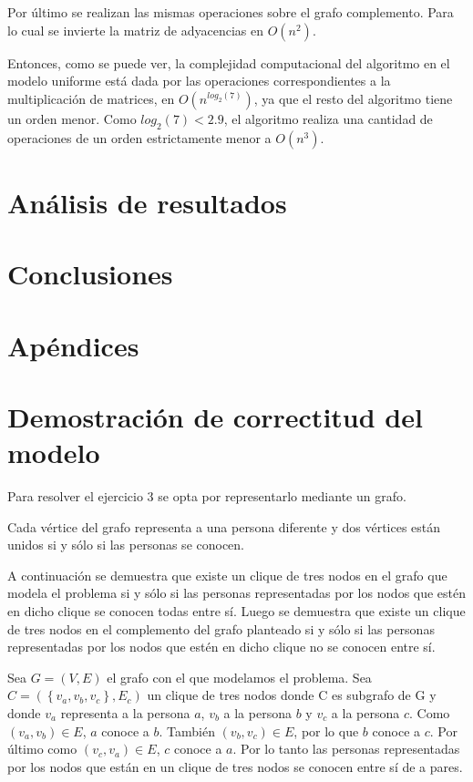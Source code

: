\documentclass[a4paper, 12pt]{article}
\begin{document}
Por \'ultimo se realizan las mismas operaciones sobre el grafo complemento. Para lo cual se invierte la matriz de adyacencias en $O \left( n^2 \right)$.


Entonces, como se puede ver, la complejidad computacional del algoritmo en el modelo uniforme est\'a dada por las operaciones correspondientes a la multiplicaci\'on de matrices, en $O \left( n^{log_2\left(7\right)} \right) $, ya que el resto del algoritmo tiene un orden menor. Como $log_2\left(7\right) < 2.9 $, el algoritmo realiza una cantidad de operaciones de un orden estrictamente menor a $O\left( n^3\right) $.




\section*{An\'alisis de resultados}
\section*{Conclusiones}

\section*{Ap\'endices}
\section{Demostraci\'on de correctitud del modelo}\label{dem_clique}

Para resolver el ejercicio 3 se opta por representarlo mediante un grafo.

Cada v\'ertice del grafo representa a una persona diferente y dos v\'ertices est\'an unidos si y s\'olo si las personas se conocen.


A continuaci\'on se demuestra que existe un clique de tres nodos en el grafo que modela el problema si y s\'olo si las personas representadas por los nodos que est\'en en dicho clique se conocen todas entre s\'i. Luego se demuestra que existe un clique de tres nodos en el complemento del grafo planteado si y s\'olo si las personas representadas por los nodos que est\'en en dicho clique no se conocen entre s\'i.

Sea $G = \left( V, E \right)$ el grafo con el que modelamos el problema. Sea $ C = \left( \left\lbrace v_a, v_b,v_c \right\rbrace, E_c \right) $ un clique de tres nodos donde C es subgrafo de G y donde $v_a$ representa a la persona $a$, $v_b$ a la persona $b$ y $v_c$ a la persona $c$. Como $\left( v_a, v_b \right) \in E $, $a$ conoce a $b$. Tambi\'en $\left(v_b,v_c\right) \in E$, por lo que $b$ conoce a $c$. Por \'ultimo como $\left(v_c,v_a\right) \in E$, $c$ conoce a $a$. Por lo tanto las personas representadas por los nodos que est\'an en un clique de tres nodos se conocen entre s\'i de a pares.
\end{document}
